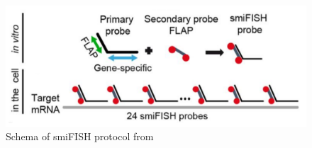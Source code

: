 


\begin{figure}
	\begin{center}
	\includegraphics[width=\linewidth]{figures/introduction/smiFISH}
	\caption[Schema of smiFISH protocol]{Schema of smiFISH protocol from~\cite{tsanov_smifish_2016}}
	\label{fig:smiFISH}
	\end{center}
\end{figure}


